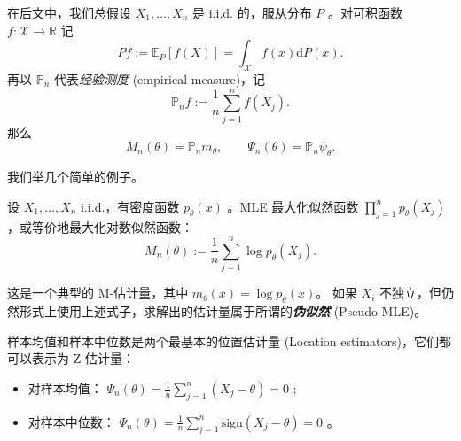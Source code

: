 在后文中，我们总假设 $X_1,\dots,X_n$ 是 i.i.d. 的，服从分布 $P$ 。对可积函数 $f:\mathscr X\to \mathbb R$ 记
\[
Pf:=\mathbb {E}_P[f(X)]=\int_{\mathscr X}f(x)\mathrm{d}P(x).
\]
再以 $\mathbb P_n$ 代表\emph{经验测度} (empirical measure)，记
\[
\mathbb P_nf:=\frac1n\sum_{j=1}^nf(X_j).
\]
那么
\[
M_n(\theta)=\mathbb P_n m_\theta,\qquad \Psi_n(\theta)=\mathbb P_n\psi_\theta.
\]

我们举几个简单的例子。

\begin{example}[极大似然估计]
设 $X_1, \ldots, X_n$ i.i.d.，有密度函数 $p_\theta(x)$ 。MLE 最大化似然函数 $\prod_{j=1}^n p_\theta(X_j)$，或等价地最大化对数似然函数：
\[
M_n(\theta) := \frac{1}{n}\sum_{j=1}^n \log p_\theta(X_j).
\]

这是一个典型的 M-估计量，其中 $m_\theta(x) = \log p_\theta(x)$。 如果 $X_i$ 不独立，但仍然形式上使用上述式子，求解出的估计量属于所谓的\textbf{\emph{伪似然}} (Pseudo-MLE)。



\end{example}

\begin{example}[均值和中位数]
样本均值和样本中位数是两个最基本的位置估计量 (Location estimators)，它们都可以表示为 Z-估计量：

\begin{itemize}
\tightlist
\item
  对样本均值： $\Psi_n(\theta) = \frac{1}{n}\sum_{j=1}^n (X_j - \theta) = 0$ ;
\item
  对样本中位数： $\Psi_n(\theta) = \frac{1}{n}\sum_{j=1}^n \text{sign}(X_j - \theta) = 0$ 。
\end{itemize}


\end{example}

